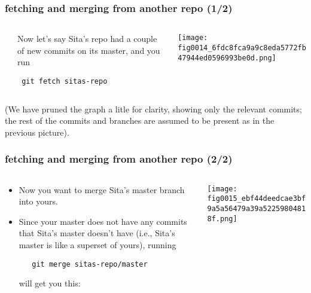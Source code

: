 \documentclass[presentation]{beamer}
\begin{document}
\begin{frame}[fragile]
\frametitle{fetching and merging from another repo (1/2)}
\label{sec-6-3}
\begin{columns} %
\label{sec-6-3-1}
\begin{column}{0.5\textwidth}
\label{sec-6-3-1-1}


Now let's say Sita's repo had a couple of new commits on its master,
and you run
\begin{verbatim}
 git fetch sitas-repo
\end{verbatim}
\end{column}
\begin{column}{0.5\textwidth}
\label{sec-6-3-1-2}


\texttt{[image: fig0014\_6fdc8fca9a9c8eda5772fb47944ed0596993be0d.png]}
\end{column}
\end{columns}
\label{sec-6-3-2}

\small
(We have pruned the graph a litle for clarity, showing only the
relevant commits; the rest of the commits and branches are assumed to
be present as in the previous picture).
\end{frame}
\begin{frame}[fragile]
\frametitle{fetching and merging from another repo (2/2)}
\label{sec-6-4}
\begin{columns}
\begin{column}{0.6\textwidth}
\label{sec-6-4-1}


\begin{itemize}
\item Now you want to merge Sita's master branch into yours.
\item Since your master does
  not have any commits that Sita's master doesn't have (i.e., Sita's master is
  like a superset of yours), running 

\begin{verbatim}
   git merge sitas-repo/master
\end{verbatim}

  will get you this:
\end{itemize}
\end{column}
\begin{column}{0.4\textwidth}
\label{sec-6-4-2}


\texttt{[image: fig0015\_ebf44deedcae3bf9a5a56479a39a52259804818f.png]}
\end{column}
\end{columns}
\end{frame}
\end{document}

